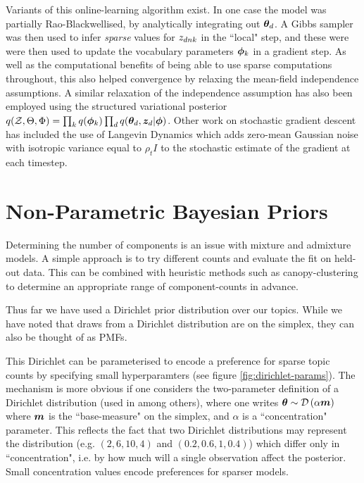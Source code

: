 Variants of this online-learning algorithm exist. In one case\cite{Mimno2012a} the model was partially Rao-Blackwellised, by analytically integrating out ${ \bm \theta_d }$. A Gibbs sampler was then used to infer \emph{sparse} values for ${ z_{dnk} }$ in the ``local" step, and these were were then used to update the vocabulary parameters ${ \bm \phi }_k$ in a gradient step. As well as the computational benefits of being able to use sparse computations throughout, this also helped convergence by relaxing the mean-field independence assumptions. A similar relaxation of the independence assumption has also been employed\cite{Hoffman2015} using the structured variational posterior \\
$q({ \mathcal{Z} }, \Theta, \Phi) = \prod_k q({ \bm \phi }_k)\prod_d q({ \bm \theta_d }, \bm z_d | { \bm \phi })$. Other work on stochastic gradient descent has included the use of Langevin Dynamics\cite{Welling2011} which adds zero-mean Gaussian noise with isotropic variance equal to $\rho_t I$ to the stochastic estimate of the gradient at each timestep.%



\section{Non-Parametric Bayesian Priors}
\label{sec:chap1:DPs}
Determining the number of components is an issue with mixture and admixture models. A simple approach is to try different counts and evaluate the fit on held-out data. This can be combined with heuristic methods such as canopy-clustering\cite{McCallum2000} to determine an appropriate range of component-counts  in advance.

Thus far we have used a Dirichlet prior distribution over our topics. While we have noted that draws from a Dirichlet distribution are on the simplex, they can also be thought of as PMFs.

This Dirichlet can be parameterised to encode a preference for sparse topic counts by specifying small hyperparamters (see figure \ref{fig:dirichlet-params}). The mechanism is more obvious if one considers the two-parameter definition of a Dirichlet distribution (used in \cite{MacKay1995}\cite{Wallach2006}\cite{Wallach2009a} among others), where one writes $\bm \theta \sim \mathcal{D} \left( {\alpha \bm m} \right)$ where $\bm m$ is the ``base-measure" on the simplex, and $\alpha$ is a ``concentration" parameter. This reflects the fact that two Dirichlet distributions may represent the distribution (e.g. $(2, 6, 10, 4)$ and $(0.2, 0.6, 1, 0.4)$) which differ only in ``concentration", i.e. by how much will a single observation affect the posterior. Small concentration values encode preferences for sparser models.

